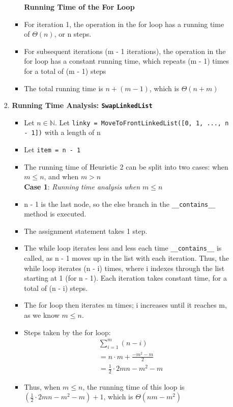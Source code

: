 \documentclass[fontsize=11pt]{article}
\begin{document}
\begin{enumerate}
\begin{enumerate}
\begin{enumerate}
\begin{itemize}
            \textbf{Running Time of the For Loop}
            \item For iteration 1, the operation in the for loop has a running time of $\Theta(n)$, or n steps.
            \item For subsequent iterations (m - 1 iterations), the operation in the for loop has a constant running time, which repeats (m - 1) times for a total of (m - 1) steps
            \item The total running time is $n + (m - 1)$, which is $\Theta(n + m)$\\
        \end{itemize}
        
        \item \textbf{Running Time Analysis: \texttt{SwapLinkedList}}
        \begin{itemize}
            \item Let $n \in \mathbb{N}$. Let \texttt{linky = MoveToFrontLinkedList([0, 1, ..., n - 1])} with a length of n
            \item Let \texttt{item = n - 1}
            \item The running time of Heuristic 2 can be split into two cases: when $m \leq n$, and when $m > n$\\
            
            \textbf{Case 1}: \emph{Running time analysis when $m \leq n$}
            \item n - 1 is the last node, so the else branch in the \texttt{\_\_contains\_\_} method is executed.
            \item The assignment statement takes 1 step.
            \item The while loop iterates less and less each time \texttt{\_\_contains\_\_} is called, as n - 1 moves up in the list with each iteration. Thus, the while loop iterates (n - i) times, where i indexes through the list starting at 1 (for n - 1). Each iteration takes constant time, for a total of (n - i) steps.
            \item The for loop then iterates m times; i increases until it reaches m, as we know $m \leq n$. 
            \item Steps taken by the for loop:
            \begin{align}
                & \sum^{m}_{i=1}(n - i)\\
                &= n \cdot m + \frac{-m^{2} - m}{2}\\
                &= \frac{1}{2} \cdot 2mn - m^{2} - m
            \end{align}
            \item Thus, when $m \leq n$, the running time of this loop is $(\frac{1}{2} \cdot 2mn - m^{2} - m) + 1$, which is $\Theta(nm - m^2)$ \\
            

\end{itemize}
\end{enumerate}
\end{enumerate}
\end{enumerate}
\end{document}
